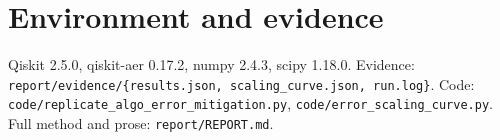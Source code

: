 \documentclass[11pt]{article}
\begin{document}
\section{Environment and evidence}
Qiskit 2.5.0, qiskit-aer 0.17.2, numpy 2.4.3, scipy 1.18.0.
Evidence: \texttt{report/evidence/\{results.json, scaling\_curve.json,
run.log\}}. Code: \texttt{code/replicate\_algo\_error\_mitigation.py},
\texttt{code/error\_scaling\_curve.py}. Full method and prose:
\texttt{report/REPORT.md}.
\end{document}
